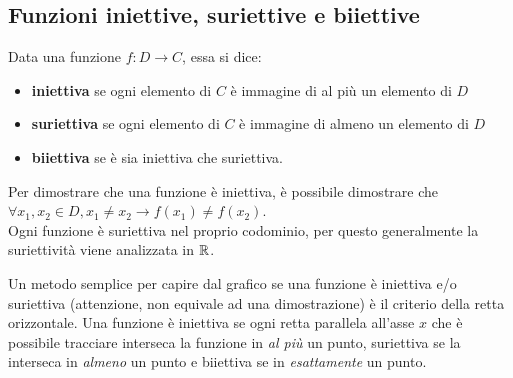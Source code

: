 \documentclass{article}     %
\begin{document}
        \subsection{Funzioni iniettive, suriettive e biiettive}
        \begin{definition}
            Data una funzione $f:D\rightarrow C$, essa si dice:
            \begin{itemize}
                \item \textbf{iniettiva} se ogni elemento di $C$ è immagine di \textnormal{al più} un elemento di $D$
                \item \textbf{suriettiva} se ogni elemento di $C$ è immagine di \textnormal{almeno} un elemento di $D$
                \item \textbf{biiettiva} se è sia iniettiva che suriettiva.
            \end{itemize}
            Per dimostrare che una funzione è iniettiva, è possibile dimostrare che $\forall x_1,x_2 \in D, x_1\neq x_2\rightarrow f(x_1)\neq f(x_2)$.\\
            Ogni funzione è suriettiva nel proprio codominio, per questo generalmente la suriettività viene analizzata in $\mathbb{R}$.
        \end{definition}
        Un metodo semplice per capire dal grafico se una funzione è iniettiva e/o suriettiva (attenzione, non equivale ad una dimostrazione) è il criterio della retta orizzontale. Una funzione è iniettiva se ogni retta parallela all'asse $x$ che è possibile tracciare interseca la funzione in \textit{al più} un punto, suriettiva se la interseca in \textit{almeno} un punto e biiettiva se in \textit{esattamente} un punto.
\end{document}
